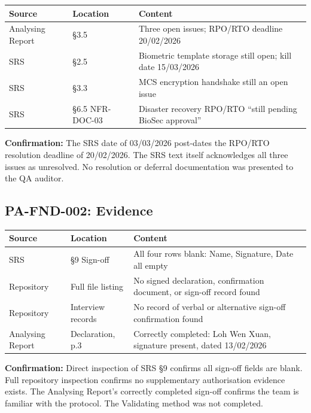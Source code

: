 \documentclass[11pt,a4paper]{article}
\begin{document}
\begin{table}[H]
\centering\small
\begin{tabular}{|l|L{3cm}|>{\RaggedRight\arraybackslash}m{6.5cm}|}
\hline
{}
\textbf{Source} & \textbf{Location} & \textbf{Content} \\\hline
Analysing Report & \S3.5 & Three open issues; RPO/RTO deadline 20/02/2026 \\\hline
SRS & \S2.5 & Biometric template storage still open; kill date 15/03/2026 \\\hline
SRS & \S3.3 & MCS encryption handshake still an open issue \\\hline
SRS & \S6.5 NFR-DOC-03 & Disaster recovery RPO/RTO ``still pending BioSec approval'' \\\hline
\end{tabular}
\end{table}

\textbf{Confirmation:} The SRS date of 03/03/2026 post-dates the RPO/RTO resolution deadline of 20/02/2026. The SRS text itself acknowledges all three issues as unresolved. No resolution or deferral documentation was presented to the QA auditor.

\subsection{PA-FND-002: Evidence}

\begin{table}[H]
\centering\small
\begin{tabular}{|l|L{3cm}|>{\RaggedRight\arraybackslash}m{6.5cm}|}
\hline
{}
\textbf{Source} & \textbf{Location} & \textbf{Content} \\\hline
SRS & \S9 Sign-off & All four rows blank: Name, Signature, Date all empty \\\hline
Repository & Full file listing & No signed declaration, confirmation document, or sign-off record found \\\hline
Repository & Interview records & No record of verbal or alternative sign-off confirmation found \\\hline
Analysing Report & Declaration, p.3 & Correctly completed: Loh Wen Xuan, signature present, dated 13/02/2026 \\\hline
\end{tabular}
\end{table}

\textbf{Confirmation:} Direct inspection of SRS \S9 confirms all sign-off fields are blank. Full repository inspection confirms no supplementary authorisation evidence exists. The Analysing Report's correctly completed sign-off confirms the team is familiar with the protocol. The Validating method was not completed.
\end{document}
